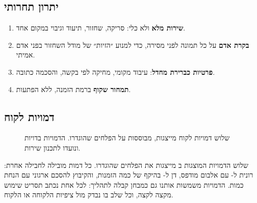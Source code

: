 \subsection{יתרון תחרותי}
\begin{enumerate}[leftmargin=*]
  \item \textbf{שירות מלא} ולא כלי: סריקה, שחזור, תיעוד וגיבוי במקום אחד.
  \item \textbf{בקרת אדם} על כל תמונה לפני מסירה, כדי למנוע ״הזיות״ של מודל השחזור בפני אדם אמיתי.
  \item \textbf{פרטיות כברירת מחדל}: עיבוד מקומי, מחיקה לפי בקשה, והסכמה כתובה.
  \item \textbf{תמחור שקוף} ברמת הזמנה, ללא הפתעות.
\end{enumerate}

\subsection{דמויות לקוח}
\begin{figure}[H]
\centering
\begin{english}\end{english}
\caption{שלוש דמויות לקוח מייצגות, מבוססות על הפלחים שהוגדרו. הדמויות בדויות ונועדו לתכנון שירות.}
\label{fig:personas}
\end{figure}

שלוש הדמויות המוצגות ב מייצגות את הפלחים שהוגדרו. כל דמות מובילה לחבילה אחרת: רונית ל- עם אלבום מודפס, דן ל- בהיקף של כמה הזמנות, והקיבוץ להסכם ארגוני עם הנחת כמות. הדמויות משמשות אותנו גם כמבחן קבלה לתהליך: לכל אחת נכתב תסריט שימוש מקצה לקצה, וכל שלב בו נבדק מול ציפיות הלקוחה או הלקוח.

